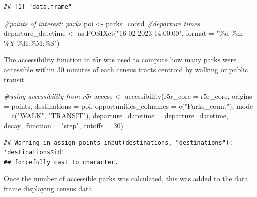 \documentclass[
]{article}
\newenvironment{Shaded}{\begin{snugshade}}{\end{snugshade}}
\newcommand{\AttributeTok}[1]{\textcolor[rgb]{0.77,0.63,0.00}{#1}}
\newcommand{\CommentTok}[1]{\textcolor[rgb]{0.56,0.35,0.01}{\textit{#1}}}
\newcommand{\DecValTok}[1]{\textcolor[rgb]{0.00,0.00,0.81}{#1}}
\newcommand{\FunctionTok}[1]{\textcolor[rgb]{0.00,0.00,0.00}{#1}}
\newcommand{\NormalTok}[1]{#1}
\newcommand{\OtherTok}[1]{\textcolor[rgb]{0.56,0.35,0.01}{#1}}
\newcommand{\SpecialCharTok}[1]{\textcolor[rgb]{0.00,0.00,0.00}{#1}}
\newcommand{\StringTok}[1]{\textcolor[rgb]{0.31,0.60,0.02}{#1}}
\begin{document}
\begin{verbatim}
## [1] "data.frame"
\end{verbatim}

\begin{Shaded}
\begin{Highlighting}[]
\CommentTok{\#points of interest: parks}
\NormalTok{poi }\OtherTok{\textless{}{-}}\NormalTok{ parks\_coord}
\CommentTok{\#departure times}
\NormalTok{departure\_datetime }\OtherTok{\textless{}{-}} \FunctionTok{as.POSIXct}\NormalTok{(}\StringTok{"16{-}02{-}2023 14:00:00"}\NormalTok{,}
                                 \AttributeTok{format =} \StringTok{"\%d{-}\%m{-}\%Y \%H:\%M:\%S"}\NormalTok{)}
\end{Highlighting}
\end{Shaded}

The accessibility function in r5r was used to compute how many parks
were accessible within 30 minutes of each census tracts centroid by
walking or public transit.

\begin{Shaded}
\begin{Highlighting}[]
\CommentTok{\#using accessibility from r5r}
\NormalTok{access }\OtherTok{\textless{}{-}} \FunctionTok{accessibility}\NormalTok{(}\AttributeTok{r5r\_core =}\NormalTok{ r5r\_core,}
                        \AttributeTok{origins =}\NormalTok{ points,}
                        \AttributeTok{destinations =}\NormalTok{ poi,}
                        \AttributeTok{opportunities\_colnames =} \FunctionTok{c}\NormalTok{(}\StringTok{"Parks\_count"}\NormalTok{),}
                        \AttributeTok{mode =} \FunctionTok{c}\NormalTok{(}\StringTok{"WALK"}\NormalTok{, }\StringTok{"TRANSIT"}\NormalTok{),}
                        \AttributeTok{departure\_datetime =}\NormalTok{ departure\_datetime,}
                        \AttributeTok{decay\_function =} \StringTok{"step"}\NormalTok{,}
                        \AttributeTok{cutoffs =} \DecValTok{30}\NormalTok{)}
\end{Highlighting}
\end{Shaded}

\begin{verbatim}
## Warning in assign_points_input(destinations, "destinations"): 'destinations$id'
## forcefully cast to character.
\end{verbatim}

Once the number of accessible parks was calculated, this was added to
the data frame displaying census data.

\begin{Shaded}
\end{Shaded}
\end{document}
